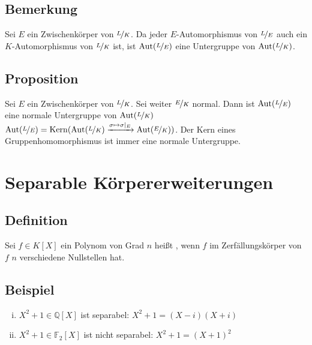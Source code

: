 \subsection[Bemerkung: $\Aut(\nicefrac{L}{E})$ ist eine Untergruppe von $\Aut(\nicefrac{L}{K})$]{Bemerkung} %
\label{sub:156}
Sei $E$ ein Zwischenkörper von $\nicefrac{L}{K}$. Da jeder $E$-Automorphismus von $\nicefrac{L}{E}$ auch ein $K$-Automorphismus von $\nicefrac{L}{K}$ ist, ist $\Aut(\nicefrac{L}{E})$ eine Untergruppe von $\Aut(\nicefrac{L}{K})$.

\subsection[Proposition: Die Automorphismengruppe normaler Zwischenkörper ist normal]{Proposition} %
\label{sub:157}
Sei $E$ ein Zwischenkörper von $\nicefrac{L}{K}$. Sei weiter $\nicefrac{E}{K}$ normal. Dann ist $\Aut(\nicefrac{L}{E})$ eine normale Untergruppe von $\Aut(\nicefrac{L}{K})$
$\operatorname{Aut}(\nicefrac{L}{E}) = \operatorname{Kern} (\operatorname{Aut}(\nicefrac{L}{K}) \xrightarrow{\sigma \mapsto \sigma|_E } \operatorname{Aut}(\nicefrac{E}{K}) ) $. Der Kern eines Gruppenhomomorphismus ist immer 
eine normale Untergruppe. \bewende
\newpage
\section{Separable Körpererweiterungen} %
\label{sec:16}

\subsection[Definition: Separable Polynome]{Definition} %
\label{sub:161}
Sei $f \in K[X]$ ein Polynom von Grad $n$ heißt , wenn $f$ im Zerfällungskörper von $f$ $n$ verschiedene Nullstellen hat.

\subsection[Beispiele für Separable und nicht separable Polynome]{Beispiel} %
\label{sub:162}
\begin{enumerate}[(i)]
	\item $X^2+1 \in \mathds{Q}[X]$ ist separabel: $X^2+1= (X-i)(X+i)$
	\item $X^2+1 \in \mathds{F}_2[X]$ ist nicht separabel: $X^2+1=(X+1)^2$
\end{enumerate}

